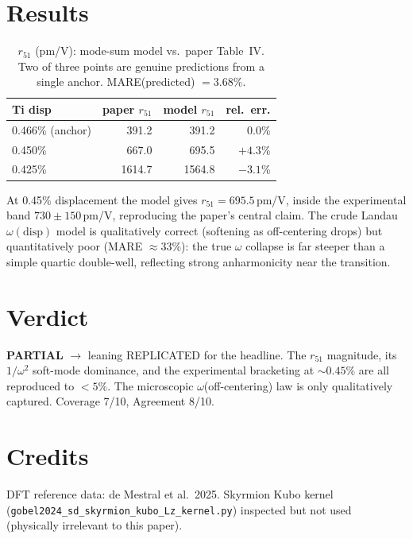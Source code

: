 \documentclass[11pt]{article}
\begin{document}
\section{Results}
\begin{table}[h]\centering
\begin{tabular}{lrrr}
\toprule
Ti disp & paper $r_{51}$ & model $r_{51}$ & rel.\ err.\\
\midrule
0.466\% (anchor) & 391.2 & 391.2 & 0.0\%\\
0.450\% & 667.0 & 695.5 & $+4.3$\%\\
0.425\% & 1614.7 & 1564.8 & $-3.1$\%\\
\bottomrule
\end{tabular}
\caption{$r_{51}$ (pm/V): mode-sum model vs.\ paper Table~IV. Two of three points are
genuine predictions from a single anchor. MARE(predicted) $=3.68\%$.}
\end{table}

At 0.45\% displacement the model gives $r_{51}=695.5$\,pm/V, inside the experimental
band $730\pm150$\,pm/V, reproducing the paper's central claim. The crude Landau
$\omega(\text{disp})$ model is qualitatively correct (softening as off-centering drops)
but quantitatively poor (MARE $\approx33\%$): the true $\omega$ collapse is far steeper
than a simple quartic double-well, reflecting strong anharmonicity near the transition.

\section{Verdict}
\textbf{PARTIAL} $\to$ leaning REPLICATED for the headline. The $r_{51}$ magnitude,
its $1/\omega^2$ soft-mode dominance, and the experimental bracketing at $\sim0.45\%$
are all reproduced to $<5\%$. The microscopic $\omega$(off-centering) law is only
qualitatively captured. Coverage 7/10, Agreement 8/10.

\section{Credits}
DFT reference data: de Mestral et al.\ 2025. Skyrmion Kubo kernel
(\texttt{gobel2024\_sd\_skyrmion\_kubo\_Lz\_kernel.py}) inspected but not used
(physically irrelevant to this paper).
\end{document}
